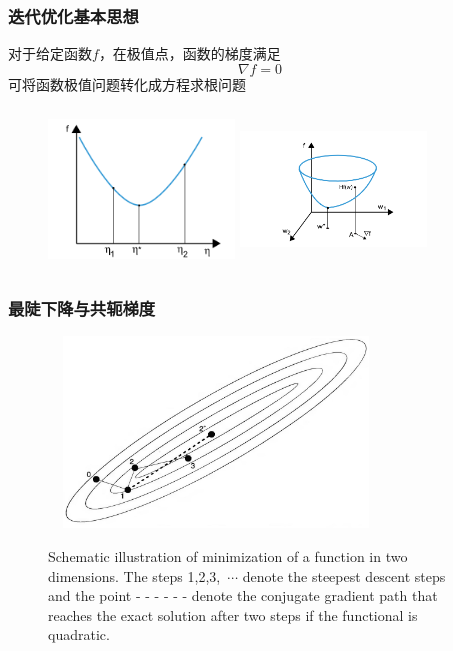 \frame
{
	\frametitle{迭代优化基本思想}
	对于给定函数$f$，在极值点，函数的梯度满足
	\begin{displaymath}
		\nabla f=0
	\end{displaymath}
	可将函数极值问题转化成方程求根问题
\begin{figure}[h!]
\centering
\includegraphics[height=1.68in,width=1.95in,viewport=30 0 450 360,clip]{Figures/OP_mini-1.png}
\hskip 0.05in
\includegraphics[height=1.68in,width=1.95in,viewport=150 20 560 390,clip]{Figures/OP_mini-2.png}
\label{OP_mini}
\end{figure}
}

\frame
{
	\frametitle{最陡下降与共轭梯度}
\begin{figure}[h!]
\centering
\includegraphics[height=2.0in,width=3.5in,viewport=0 0 950 590,clip]{Figures/OP_descent_CG.png}
\label{decent_CG}
\caption{\tiny \textrm{Schematic illustration of minimization of a function in two dimensions. The steps 1,2,3,~$\cdots$ denote the steepest descent steps and the point - \!- \!- \!- \!- \!- denote the conjugate gradient path that reaches the exact solution after two steps if the functional is quadratic.}}%
\end{figure}
}

